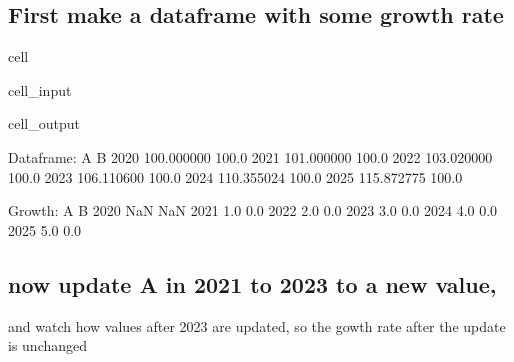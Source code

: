\documentclass[letterpaper,10pt,english]{jupyterBook}
\begin{document}
\subsection{First make a dataframe with some growth rate}
\label{\detokenize{content/howto/update/model update:first-make-a-dataframe-with-some-growth-rate}}
\begin{sphinxuseclass}{cell}\begin{sphinxVerbatimInput}

\begin{sphinxuseclass}{cell_input}
\begin{sphinxVerbatim}[commandchars=\\\{\}]
    
\end{sphinxVerbatim}

\end{sphinxuseclass}\end{sphinxVerbatimInput}
\begin{sphinxVerbatimOutput}

\begin{sphinxuseclass}{cell_output}
\begin{sphinxVerbatim}[commandchars=\\\{\}]
Dataframe:
               A      B
2020  100.000000  100.0
2021  101.000000  100.0
2022  103.020000  100.0
2023  106.110600  100.0
2024  110.355024  100.0
2025  115.872775  100.0

Growth:
        A    B
2020  NaN  NaN
2021  1.0  0.0
2022  2.0  0.0
2023  3.0  0.0
2024  4.0  0.0
2025  5.0  0.0
\end{sphinxVerbatim}

\end{sphinxuseclass}\end{sphinxVerbatimOutput}

\end{sphinxuseclass}

\subsection{now update A in 2021 to 2023 to a new value,}
\label{\detokenize{content/howto/update/model update:now-update-a-in-2021-to-2023-to-a-new-value}}
\sphinxAtStartPar
and watch how values after 2023 are updated, so the gowth rate after the update is unchanged
\end{document}
